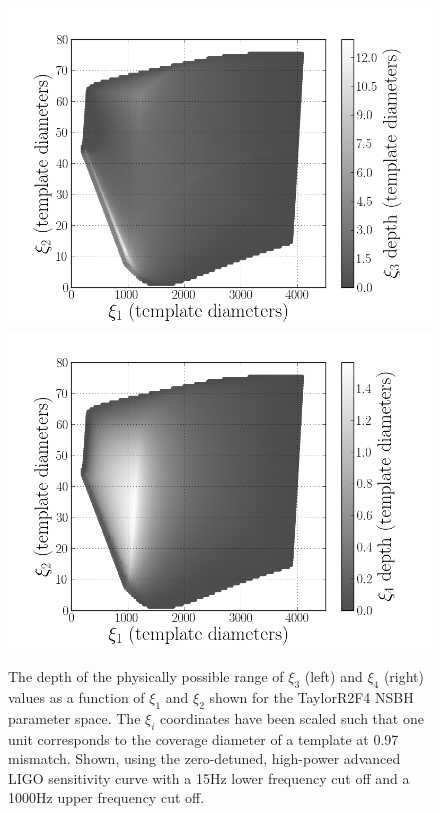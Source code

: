\begin{figure}
    \centering
    \begin{minipage}[l]{\columnwidth}
    \centering
\includegraphics[width=1.0\textwidth]
{papers/nsbh_effectualness/figure2A.png}
\includegraphics[width=1.0\textwidth]
{papers/nsbh_effectualness/figure2B.png}
\caption{\label{fig:bankF4depths}
The depth of the
physically possible range of $\xi_3$ (left) and $\xi_4$ (right) values as a
function of
$\xi_1$ and $\xi_2$ shown for the TaylorR2F4 \ac{NSBH} parameter
space. The $\xi_i$ coordinates have been scaled
such that one unit corresponds to the coverage diameter of a template
at 0.97 mismatch. Shown, using the zero-detuned, high-power advanced LIGO
sensitivity curve with a 15Hz
lower frequency cut off and a 1000Hz upper frequency cut off.}
\end{minipage}
\end{figure}

